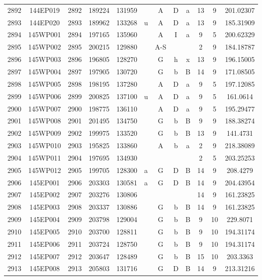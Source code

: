 \begin{tabular}{|*{12}{c|}}
2892 & 144EP019 & 2892 & 189224 & 131959 &  & A & D & a & 13 & 9 & 201.02307 \\ 
2893 & 144EP020 & 2893 & 189962 & 133268 & u & A & D & a & 13 & 9 & 185.31909 \\ 
2894 & 145WP001 & 2894 & 197165 & 135960 &  & A & I & a & 9 & 5 & 200.62329 \\ 
2895 & 145WP002 & 2895 & 200215 & 129880 &  & A-S &  &  & 2 & 9 & 184.18787 \\ 
2896 & 145WP003 & 2896 & 196805 & 128270 &  & G & h & x & 13 & 9 & 196.15005 \\ 
2897 & 145WP004 & 2897 & 197905 & 130720 &  & G & b & B & 14 & 9 & 171.08505 \\ 
2898 & 145WP005 & 2898 & 198195 & 137280 &  & A & D & a & 9 & 5 & 197.12085 \\ 
2899 & 145WP006 & 2899 & 200825 & 137100 & u & A & D & a & 9 & 5 & 161.0614 \\ 
2900 & 145WP007 & 2900 & 198775 & 136110 &  & A & D & a & 9 & 5 & 195.29477 \\ 
2901 & 145WP008 & 2901 & 201495 & 134750 &  & G & b & B & 9 & 9 & 188.38274 \\ 
2902 & 145WP009 & 2902 & 199975 & 133520 &  & G & b & B & 13 & 9 & 141.4731 \\ 
2903 & 145WP010 & 2903 & 195825 & 133860 &  & A & b & a & 2 & 9 & 218.38089 \\ 
2904 & 145WP011 & 2904 & 197695 & 134930 &  &  &  &  & 2 & 5 & 203.25253 \\ 
2905 & 145WP012 & 2905 & 199705 & 128300 & a & G & D & B & 14 & 9 & 208.4279 \\ 
2906 & 145EP001 & 2906 & 203303 & 130581 & a & G & D & B & 14 & 9 & 204.43954 \\ 
2907 & 145EP002 & 2907 & 203276 & 130806 &  &  &  &  & 14 & 9 & 161.23825 \\ 
2908 & 145EP003 & 2908 & 203337 & 130886 &  & G & b & B & 14 & 9 & 161.23825 \\ 
2909 & 145EP004 & 2909 & 203798 & 129004 &  & G & b & B & 9 & 10 & 229.8071 \\ 
2910 & 145EP005 & 2910 & 203700 & 128811 &  & G & b & B & 9 & 10 & 194.31174 \\ 
2911 & 145EP006 & 2911 & 203724 & 128750 &  & G & b & B & 9 & 10 & 194.31174 \\ 
2912 & 145EP007 & 2912 & 203647 & 128489 &  & G & b & B & 15 & 10 & 203.3363 \\ 
2913 & 145EP008 & 2913 & 205803 & 131716 &  & G & D & B & 14 & 9 & 213.31216 \\ 

\end{tabular}
